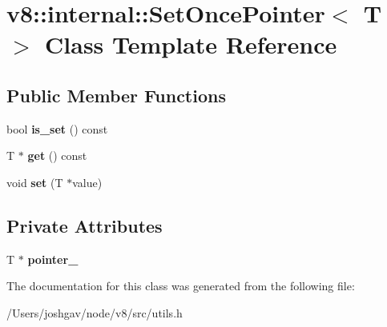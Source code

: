 \hypertarget{classv8_1_1internal_1_1_set_once_pointer}{}\section{v8\+:\+:internal\+:\+:Set\+Once\+Pointer$<$ T $>$ Class Template Reference}
\label{classv8_1_1internal_1_1_set_once_pointer}
\subsection*{Public Member Functions}
\begin{DoxyCompactItemize}
\item 
bool {\bfseries is\+\_\+set} () const \hypertarget{classv8_1_1internal_1_1_set_once_pointer_ae7309ae47825023c583dc975ab64f3bf}{}\label{classv8_1_1internal_1_1_set_once_pointer_ae7309ae47825023c583dc975ab64f3bf}

\item 
T $\ast$ {\bfseries get} () const \hypertarget{classv8_1_1internal_1_1_set_once_pointer_a371f29e48328551e8c57f29b961f44b8}{}\label{classv8_1_1internal_1_1_set_once_pointer_a371f29e48328551e8c57f29b961f44b8}

\item 
void {\bfseries set} (T $\ast$value)\hypertarget{classv8_1_1internal_1_1_set_once_pointer_a7ebb0e5532437fd52a91fd0c8ed60bd8}{}\label{classv8_1_1internal_1_1_set_once_pointer_a7ebb0e5532437fd52a91fd0c8ed60bd8}

\end{DoxyCompactItemize}
\subsection*{Private Attributes}
\begin{DoxyCompactItemize}
\item 
T $\ast$ {\bfseries pointer\+\_\+}\hypertarget{classv8_1_1internal_1_1_set_once_pointer_a1f4e430d7bdce124ac45d045eb9530ed}{}\label{classv8_1_1internal_1_1_set_once_pointer_a1f4e430d7bdce124ac45d045eb9530ed}

\end{DoxyCompactItemize}


The documentation for this class was generated from the following file\+:\begin{DoxyCompactItemize}
\item 
/\+Users/joshgav/node/v8/src/utils.\+h\end{DoxyCompactItemize}

